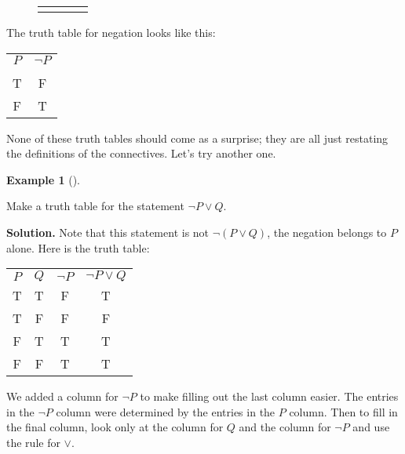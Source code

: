 \documentclass[10pt,]{book}
\theoremstyle{plain}
\theoremstyle{definition}
\newtheorem{example}[theorem]{Example}
\theoremstyle{definition}
\theoremstyle{definition}
\numberwithin{equation}{chapter}
\newcommand{\hrulethin}  {\noalign{\hrule height 0.04em}}
\newlength{\panelmax}
\begin{document}
{\leavevmode%
\setlength{\tabcolsep}{0\textwidth}
\begin{figure}
\begin{tabular}{@{}*{4}{c}@{}}
\begin{minipage}[c][\panelmax][t]{0.25\textwidth}\usebox{\panelboxNtabular}\end{minipage}&
\begin{minipage}[c][\panelmax][t]{0.25\textwidth}\usebox{\panelboxOtabular}\end{minipage}&
\begin{minipage}[c][\panelmax][t]{0.25\textwidth}\usebox{\panelboxPtabular}\end{minipage}&
\begin{minipage}[c][\panelmax][t]{0.25\textwidth}\usebox{\panelboxQtabular}\end{minipage}\end{tabular}
\end{figure}
}%
\par

          The truth table for negation looks like this:
\leavevmode%
\begin{table}
\centering
\begin{tabular}{cc}
\(P\)&\(\neg P\)\tabularnewline[0pt]
&\tabularnewline\hrulethin
T&F\tabularnewline[0pt]
F&T\tabularnewline[0pt]

\end{tabular}
\end{table}
\par

          None of these truth tables should come as a surprise; they are all just restating the definitions of the connectives. Let's try another one.
\begin{example}[]\label{example-83}

              Make a truth table for the statement \(\neg P \vee Q\).
\par\medskip\noindent%
\textbf{Solution.}\quad
              Note that this statement is not \(\neg(P \vee Q)\), the negation belongs to \(P\) alone. Here is the truth table:
\leavevmode%
\begin{table}
\centering
\begin{tabular}{cccc}
\(P\)&\(Q\)&\(\neg P\)&\(\neg P \vee Q\)\tabularnewline\hrulethin
T&T&F&T\tabularnewline[0pt]
T&F&F&F\tabularnewline[0pt]
F&T&T&T\tabularnewline[0pt]
F&F&T&T
\end{tabular}
\end{table}
\par

              We added a column for \(\neg P\) to make filling out the last column easier. The entries in the \(\neg P\) column were determined by the entries in the \(P\) column. Then to fill in the final column, look only at the column for \(Q\) and the column for \(\neg P\) and use the rule for \(\vee\).
\end{example}
\par
\end{document}
